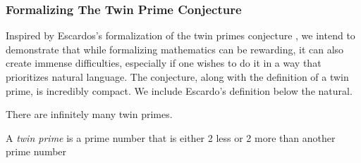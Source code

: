 \begin{code}[hide]
\AgdaSymbol{;}\AgdaSpace{}%
\AgdaSymbol{;}\AgdaSpace{}%
\AgdaSymbol{)}\<%
\\
%
\\[\AgdaEmptyExtraSkip]%
\>[0]\AgdaOperator{\AgdaFunction{\AgdaUnderscore{}-\AgdaUnderscore{}}}\AgdaSpace{}%
\AgdaSymbol{:}\AgdaSpace{}%
\AgdaSpace{}%
\AgdaSpace{}%
\AgdaSpace{}%
\AgdaSpace{}%
\<%
\\
\>[0]%
\>[6]\AgdaOperator{\AgdaFunction{-}}\AgdaSpace{}%
\AgdaSpace{}%
\AgdaSymbol{=}\AgdaSpace{}%
\<%
\\
\>[0]%
\>[6]\AgdaOperator{\AgdaFunction{-}}\AgdaSpace{}%
\AgdaSpace{}%
\AgdaSpace{}%
\AgdaSymbol{=}\AgdaSpace{}%
\<%
\\
\>[0]\AgdaSpace{}%
\AgdaSpace{}%
\AgdaOperator{\AgdaFunction{-}}\AgdaSpace{}%
\AgdaSpace{}%
\AgdaSpace{}%
\AgdaSymbol{=}\AgdaSpace{}%
\AgdaSpace{}%
\AgdaOperator{\AgdaFunction{-}}\AgdaSpace{}%
\<%
\end{code}
\subsubsection{Formalizing The Twin Prime Conjecture} \label{really}

Inspired by Escardos's formalization of the twin primes conjecture
\cite{escardó2020introduction}, we intend to demonstrate that while formalizing
mathematics can be rewarding, it can also create immense difficulties,
especially if one wishes to do it in a way that prioritizes natural language.
The conjecture, along with the definition of a twin prime, is incredibly
compact. We include Escardo's definition below the natural.

\begin{lem}
There are infinitely many twin primes.
\end{lem}

\begin{definition}\label{def:def10}
A \emph{twin prime} is a prime number that is either 2 less or 2 more than another prime number
\end{definition}


